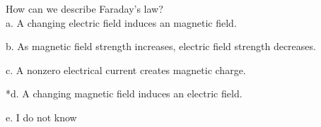 
How can we describe Faraday's law? \\

a. A changing electric field induces an magnetic field.

b. As magnetic field strength increases, electric field strength decreases.

c. A nonzero electrical current creates magnetic charge.

*d. A changing magnetic field induces an electric field.

e. I do not know \\
